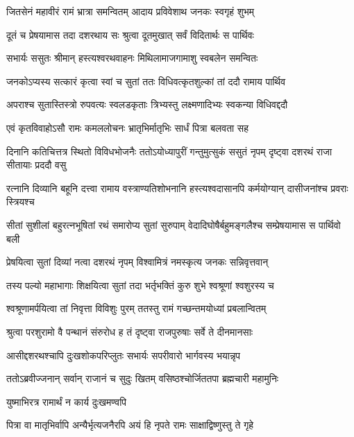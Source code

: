 \twolineshloka
{जितसेनं महावीरं रामं भ्रात्रा समन्वितम्}
{आदाय प्रविवेशाथ जनकः स्वगृहं शुभम्} %

\twolineshloka
{दूतं च प्रेषयामास तदा दशरथाय सः}
{श्रुत्वा दूतमुखात् सर्वं विदितार्थः स पार्थिवः} %

\twolineshloka
{सभार्यः ससुतः श्रीमान् हस्त्यश्वरथवाहनः}
{मिथिलामाजगामाशु स्वबलेन समन्वितः} %

\twolineshloka
{जनकोऽप्यस्य सत्कारं कृत्वा स्वां च सुतां ततः}
{विधिवत्कृतशुल्कां तां ददौ रामाय पार्थिव} %

\twolineshloka
{अपराश्च सुतास्तिस्त्रो रुपवत्यः स्वलडकृताः}
{त्रिभ्यस्तु लक्ष्मणादिभ्यः स्वकन्या विधिवद्ददौ} %

\twolineshloka
{एवं कृतविवाहोऽसौ रामः कमललोचनः}
{भ्रातृभिर्मातृभिः सार्धं पित्रा बलवता सह} %

\threelineshloka
{दिनानि कतिचित्तत्र स्थितो विविधभोजनैः}
{ततोऽयोध्यापुरीं गन्तुमुत्सुकं ससुतं नृपम्}
{दृष्ट्वा दशरथं राजा सीतायाः प्रददौ वसु} %

\fourlineindentedshloka
{रत्नानि दिव्यानि बहूनि दत्त्वा}
{रामाय वस्त्राण्यतिशोभनानि}
{हस्त्यश्वदासानपि कर्मयोग्यान्}
{दासीजनांश्च प्रवराः स्त्रियश्च} %

\fourlineindentedshloka
{सीतां सुशीलां बहुरत्नभूषितां}
{रथं समारोप्य सुतां सुरुपाम्}
{वेदादिघोषैर्बहुमङ्गलैश्च}
{सम्प्रेषयामास स पार्थिवो बली} %

\twolineshloka
{प्रेषयित्वा सुतां दिव्यां नत्वा दशरथं नृपम्}
{विश्वामित्रं नमस्कृत्य जनकः सन्निवृत्तवान्} %

\twolineshloka
{तस्य पल्यो महाभागाः शिक्षयित्वा सुतां तदा}
{भर्तृभक्तिं कुरु शुभे श्वश्रूणां श्वशुरस्य च} %

\twolineshloka
{श्वश्रूणामर्पयित्वा तां निवृत्ता विविशुः पुरम्}
{ततस्तु रामं गच्छन्तमयोध्यां प्रबलान्वितम्} %

\twolineshloka
{श्रुत्वा परशुरामो वै पन्थानं संरुरोध ह}
{तं दृष्ट्वा राजपुरुषाः सर्वे ते दीनमानसाः} %

\twolineshloka
{आसीद्दशरथश्चापि दुःखशोकपरिप्लुतः}
{सभार्यः सपरीवारो भार्गवस्य भयान्नृप} %

\twolineshloka
{ततोऽब्रवीज्जनान् सर्वान् राजानं च सुदुः खितम्}
{वसिष्ठश्चोर्जिततपा ब्रह्मचारी महामुनिः} %


\onelineshloka
{युष्माभिरत्र रामार्थं न कार्य दुःखमण्वपि} %

\twolineshloka
{पित्रा वा मातृभिर्वापि अन्यैर्भृत्यजनैरपि}
{अयं हि नृपते रामः साक्षाद्विष्णुस्तु ते गृहे} %

